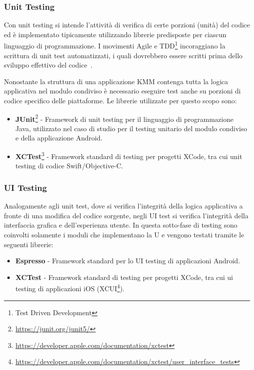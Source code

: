 \subsubsection*{Unit Testing}
Con unit testing si intende l’attività di verifica di certe porzioni (unità) del codice ed è implementato tipicamente utilizzando librerie predisposte per ciascun linguaggio di programmazione. I movimenti Agile e TDD\footnote{Test Driven Development} incoraggiano la scrittura di unit test automatizzati, i quali dovrebbero essere scritti prima dello sviluppo effettivo del codice~\cite{martin2017clean}.

Nonostante la struttura di una applicazione KMM contenga tutta la logica applicativa nel modulo condiviso è necessario eseguire test anche su porzioni di codice specifico delle piattaforme. Le librerie utilizzate per questo scopo sono:

\begin{itemize}
    \item \textbf{JUnit}\footnote{\href{https://junit.org/junit5/}{https://junit.org/junit5/}} - Framework di unit testing per il linguaggio di programmazione Java, utilizzato nel caso di studio per il testing unitario del modulo condiviso e della applicazione Android.
    \item \textbf{XCTest}\footnote{\href{https://developer.apple.com/documentation/xctest}{https://developer.apple.com/documentation/xctest}} - Framework standard di testing per progetti XCode, tra cui unit testing di codice Swift/Objective-C.
\end{itemize}

\subsubsection*{UI Testing}
Analogamente agli unit test, dove si verifica l'integrità della logica applicativa a fronte di una modifica del codice sorgente, negli UI test si verifica l'integrità della interfaccia grafica e dell'esperienza utente. In questa sotto-fase di testing sono coinvolti solamente i moduli che implementano la U e vengono testati tramite le seguenti librerie:

\begin{itemize}
    \item \textbf{Espresso} - Framework standard per lo UI testing di applicazioni Android.
    \item \textbf{XCTest} - Framework standard di testing per progetti XCode, tra cui ui testing di applicazioni iOS (XCUI\footnote{\href{https://developer.apple.com/documentation/xctest/user\_interface\_tests}{https://developer.apple.com/documentation/xctest/user\_interface\_tests}}).
\end{itemize}


